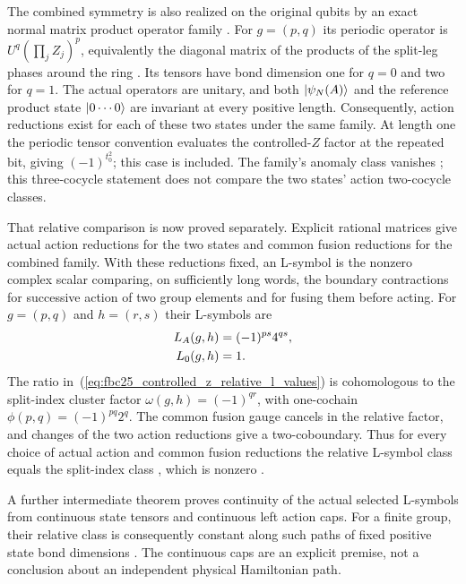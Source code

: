 \documentclass{article}
\begin{document}
The combined symmetry is also realized on the original qubits by an exact
normal matrix product operator family
.
For $g=(p,q)$ its periodic operator is
$U^q(\prod_jZ_j)^p$, equivalently the diagonal matrix of the products of
the split-leg phases around the ring
. Its tensors have bond
dimension one for $q=0$ and two for $q=1$. The actual operators are unitary,
and both $|\psi_N(A)\rangle$ and the reference product state
$|0\cdots0\rangle$ are invariant at every positive length. Consequently,
action reductions exist for each of these two states under the same family.
At length one the periodic tensor convention evaluates the controlled-$Z$
factor at the repeated bit, giving $(-1)^{t_0^2}$; this case is included.
The family's anomaly class vanishes
; this
three-cocycle statement does not compare the two states' action
two-cocycle classes.

That relative comparison is now proved separately. Explicit rational
matrices give actual action reductions for the two states and common fusion
reductions for the combined family. With these reductions fixed, an
L-symbol is the nonzero complex scalar comparing, on sufficiently long
words, the boundary contractions for successive action of two group
elements and for fusing them before acting. For $g=(p,q)$ and $h=(r,s)$
their L-symbols are
\begin{align}
    L_A(g,h)&=(-1)^{ps}4^{qs},\notag\\
    L_0(g,h)&=1.
    \label{eq:fbc25_controlled_z_relative_l_values}
\end{align}
The ratio in~(\ref{eq:fbc25_controlled_z_relative_l_values}) is cohomologous to the split-index cluster factor
$\omega(g,h)=(-1)^{qr}$, with one-cochain
$\phi(p,q)=(-1)^{pq}2^q$. The common fusion gauge cancels in the relative
factor, and changes of the two action reductions give a two-coboundary.
Thus for every choice of actual action and common fusion reductions the
relative L-symbol class equals the split-index class
, which is nonzero
.

A further intermediate theorem proves continuity of the actual selected
L-symbols from continuous state tensors and continuous left action caps.
For a finite group, their relative class is consequently constant along
such paths of fixed positive state bond dimensions
.
The continuous caps are an explicit premise, not a conclusion about an
independent physical Hamiltonian path.
\end{document}
